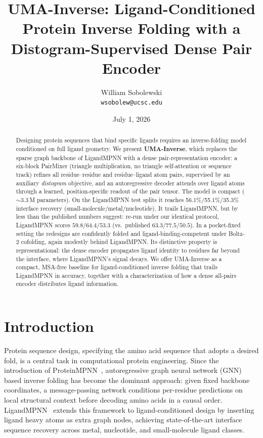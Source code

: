 \documentclass[11pt,letterpaper]{article}
\title{\textbf{UMA-Inverse: Ligand-Conditioned Protein Inverse Folding
       with a Distogram-Supervised Dense Pair Encoder}}
\author{William Sobolewski\\
        \texttt{wsobolew@ucsc.edu}}
\date{July 1, 2026}
\begin{document}
\maketitle

\begin{abstract}
Designing protein sequences that bind specific ligands requires an inverse-folding model conditioned
on full ligand geometry. We present \textbf{UMA-Inverse},
which replaces the sparse graph backbone of LigandMPNN with a dense pair-representation encoder: a
six-block PairMixer (triangle multiplication, no triangle self-attention or sequence track) refines
all residue--residue and residue--ligand atom pairs, supervised by an auxiliary \emph{distogram}
objective, and an autoregressive decoder attends over ligand atoms through a learned, position-specific
readout of the pair tensor. The model is compact ($\sim$3.3\,M parameters). On the LigandMPNN test
splits it reaches 56.1\%/55.1\%/35.3\% interface recovery
(small-molecule/metal/nucleotide). It trails LigandMPNN, but by less than the published numbers
suggest: re-run under our identical protocol, LigandMPNN scores $59.8$/$64.4$/$53.3$ (vs.\ published
$63.3$/$77.5$/$50.5$). In a
pocket-fixed setting the redesigns are confidently folded and ligand-binding-competent under Boltz-2
cofolding, again modestly behind LigandMPNN. Its distinctive property is representational: the dense
encoder propagates ligand identity to residues far beyond the interface, where LigandMPNN's signal
decays. We offer UMA-Inverse as a compact, MSA-free baseline for ligand-conditioned inverse folding
that trails LigandMPNN in accuracy, together with a characterization of how a dense all-pairs encoder
distributes ligand information.
\end{abstract}

\section{Introduction}

Protein sequence design, specifying the amino acid sequence that adopts a desired fold, is a
central task in computational protein engineering. Since the introduction of
ProteinMPNN~\citep{dauparas2022proteinmpnn}, autoregressive graph neural network (GNN) based inverse
folding has become the dominant approach: given fixed backbone coordinates, a message-passing
network conditions per-residue predictions on local structural context before decoding amino acids
in a causal order. LigandMPNN~\citep{dauparas2025ligandmpnn} extends this framework to
ligand-conditioned design by inserting ligand heavy atoms as extra graph nodes, achieving
state-of-the-art interface sequence recovery across metal, nucleotide, and small-molecule ligand
classes.
\end{document}
